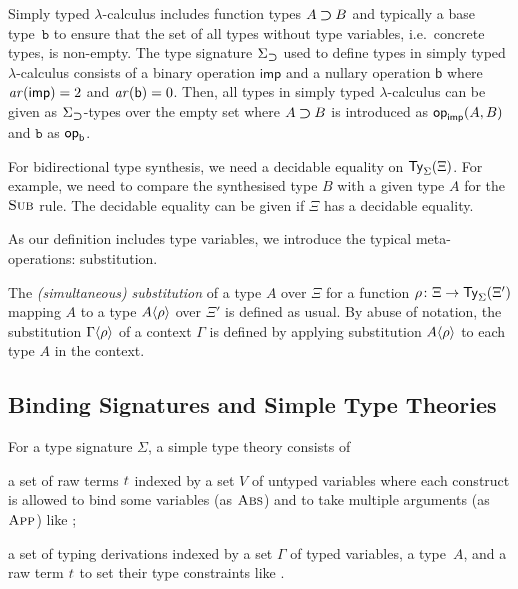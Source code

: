 \begin{example} \label{ex:type-signature-for-function-type}
  Simply typed $\lambda$-calculus includes function types $A \mathbin{\bm{\supset}} B$ and typically a base type~$\mathtt{b}$ to ensure that the set of all types without type variables, i.e.\ concrete types, is non-empty.
  The type signature $\Sigma_{\mathbin{\bm{\supset}}}$ used to define types in simply typed $\lambda$-calculus consists of a binary operation $\mathsf{imp}$ and a nullary operation $\mathsf{b}$ where $\mathit{ar}(\mathsf{imp}) = 2$ and $\mathit{ar}(\mathsf{b}) = 0$.
  Then, all types in simply typed $\lambda$-calculus can be given as $\Sigma_{\mathbin{\bm{\supset}}}$-types over the empty set where $A \mathbin{\bm{\supset}} B$ is introduced as $\mathsf{op}_{\mathsf{imp}}(A, B)$ and $\mathtt{b}$ as $\mathsf{op}_{\mathsf{b}}$. 
\end{example}

For bidirectional type synthesis, we need a decidable equality on $\mathsf{Ty}_{\Sigma}(\Xi)$.
For example, we need to compare the synthesised type $B$ with a given type $A$ for the $\textnormal{\textsc{Sub}}$ rule.
The decidable equality can be given if $\Xi$ has a decidable equality.

As our definition includes type variables, we introduce the typical meta-operations: substitution.
\begin{definition}
  The \emph{(simultaneous) substitution} of a type $A$ over $\Xi$ for a function $\rho\colon\Xi \to \mathsf{Ty}_{\Sigma}(\Xi')$ mapping $A$ to a type ${A}\!\left<{\rho}\right>$ over $\Xi'$ is defined as usual.
  By abuse of notation, the substitution ${\Gamma}\!\left<{\rho}\right>$ of a context $\Gamma$ is defined by applying substitution ${A}\!\left<{\rho}\right>$ to each type $A$ in the context.
\end{definition}

\subsection{Binding Signatures and Simple Type Theories} \label{subsec:binding-sig}

For a type signature $\Sigma$, a simple type theory consists of
\begin{enumerate*}
  \item a set of raw terms $\isTerm{t}$ indexed by a set $V$ of untyped variables where each construct is allowed to bind some variables (as $\textnormal{\textsc{Abs}}$) and to take multiple arguments (as $\textnormal{\textsc{App}}$) like ;
  \item a set of typing derivations indexed by a set $\Gamma$ of typed variables, a type~$A$, and a raw term $\isTerm{t}$ to set their type constraints like . 
\end{enumerate*}

